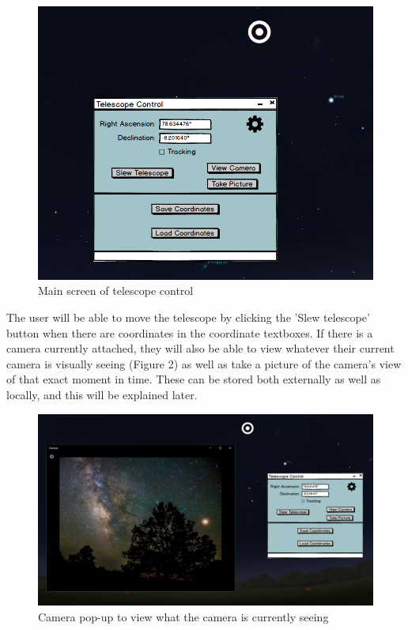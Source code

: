 \documentclass[12pt]{report}
\begin{document}
\begin{figure}[h]
	\centering
	\includegraphics[width=0.85\linewidth]{MainScreen}
	\caption{Main screen of telescope control}
\end{figure}

The user will be able to move the telescope by clicking the 'Slew telescope' button when there are coordinates in the coordinate textboxes. If there is a camera currently attached, they will also be able to view whatever their current camera is visually seeing (Figure 2) as well as take a picture of the camera's view of that exact moment in time. These can be stored both externally as well as locally, and this will be explained later. 

\newpage

\begin{figure}[h]
	\centering
	\includegraphics[width=0.90\linewidth]{MainScreenwithCameraView}
	\caption{Camera pop-up to view what the camera is currently seeing}
\end{figure}
\end{document}
